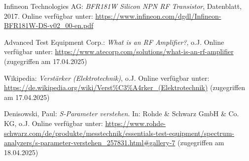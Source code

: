 \begin{thebibliography}{1}
Infineon Technologies AG: \emph{BFR181W Silicon NPN RF Transistor}, Datenblatt, 2017. Online verfügbar unter: \url{https://www.infineon.com/dgdl/Infineon-BFR181W-DS-v02_00-en.pdf}

Advanced Test Equipment Corp.: \emph{What is an RF Amplifier?}, o.J. Online verfügbar unter: \url{https://www.atecorp.com/solutions/what-is-an-rf-amplifier} (zugegriffen am 17.04.2025)

Wikipedia: \emph{Verstärker (Elektrotechnik)}, o.J. Online verfügbar unter: \url{https://de.wikipedia.org/wiki/Verst%C3%A4rker_(Elektrotechnik)} (zugegriffen am 17.04.2025)

Denisowski, Paul: \emph{S-Parameter verstehen}. In: Rohde \& Schwarz GmbH \& Co. KG, o.J. Online verfügbar unter: \url{https://www.rohde-schwarz.com/de/produkte/messtechnik/essentials-test-equipment/spectrum-analyzers/s-parameter-verstehen\_257831.html\#gallery-7} (zugegriffen am 18.04.2025)
\end{thebibliography}
%
\clearpage